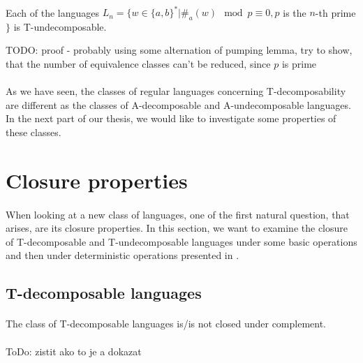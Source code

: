 \paragraph{}
\dokaz Each of the languages $L_{n} = \{ w \in \{ a, b\}^* | \#_{a}(w) \mod p \equiv 0, p$ is the $n$-th prime$\}$ is T-undecomposable.

\color{red}TODO: proof - probably using some alternation of pumping lemma, try to show, that the number of equivalence classes can't be reduced, since  $p$ is prime\color{black}\\
\square

\paragraph{}
As we have seen, the classes of regular languages concerning T-decomposability are different as the classes of A-decomposable and A-undecomposable languages. In the next part of our thesis, we would like to investigate some properties of these classes.

\section{Closure properties}

\paragraph{}
When looking at a new class of languages, one of the first natural question, that arises, are its closure properties.  In this section, we want to examine the closure of T-decomposable and T-undecomposable languages under some basic operations and then under deterministic operations presented in \cite{AFDL}.

\subsection{T-decomposable languages}
\paragraph{}
\cveta The class of T-decomposable languages is/is not closed under complement.

\paragraph{}
\dokaz \color{red}ToDo: zistit ako to je a dokazat\color{black}\\
\square

